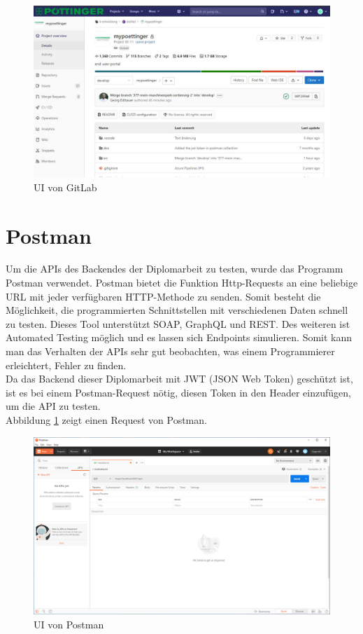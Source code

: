 \begin{figure}[H]
	\centerline{
		\includegraphics[width=1\textwidth, frame]{./grafiken/gitlab_startseite.JPG}
	}
	\vskip0pt
	\caption{UI von GitLab}
\end{figure}
\section{Postman}
Um die APIs des Backendes der Diplomarbeit zu testen, wurde das Programm Postman verwendet. Postman bietet die Funktion Http-Requests an eine beliebige URL mit jeder verfügbaren HTTP-Methode zu senden. Somit besteht die Möglichkeit, die programmierten Schnittstellen mit verschiedenen Daten schnell zu testen. Dieses Tool unterstützt SOAP, GraphQL und REST. Des weiteren ist Automated Testing möglich und es lassen sich Endpoints simulieren. Somit kann man das Verhalten der APIs sehr gut beobachten, was einem Programmierer erleichtert, Fehler zu finden. \autocite{postmanDocs} \\
Da das Backend dieser Diplomarbeit mit JWT (JSON Web Token) geschützt ist, ist es bei einem Postman-Request nötig, diesen Token in den Header einzufügen, um die API zu testen.  \\
Abbildung \ref{fig:postman} zeigt einen Request von Postman.
\begin{figure}[H]
	\centerline{
		\includegraphics[width=1\textwidth, frame]{./grafiken/postman.png}
	}
	\vskip0pt
	\caption{UI von Postman} \label{fig:postman}
\end{figure}


